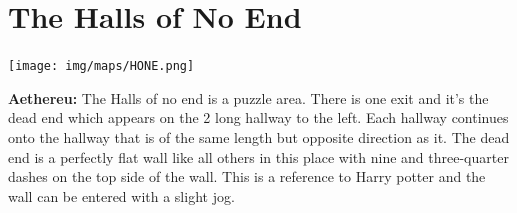 \section{The Halls of No End}
\begin{center}
	\texttt{[image: img/maps/HONE.png]} 
	
	{\textbf{Aethereu:} The Halls of no end is a puzzle area. There is one exit and it's the dead end which appears on the 2 long hallway to the left. Each hallway continues onto the hallway that is of the same length but opposite direction as it. The dead end is a perfectly flat wall like all others in this place with nine and three-quarter dashes on the top side of the wall. This is a reference to Harry potter and the wall can be entered with a slight jog.}
\end{center}